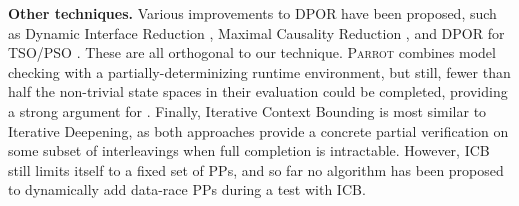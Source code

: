 {\bf Other techniques.} Various improvements to DPOR have been proposed, such as Dynamic Interface Reduction \cite{demeter}, Maximal Causality Reduction \cite{mcr}, and DPOR for TSO/PSO \cite{tsopso}.
These are all orthogonal to our technique.
\textsc{Parrot} \cite{parrot} combines model checking with a partially-determinizing runtime environment, but still, fewer than half the non-trivial state spaces in their evaluation could be completed, providing a strong argument for \quicksand.
Finally, Iterative Context Bounding \cite{chess} is most similar to Iterative Deepening, as both approaches provide a concrete partial verification on some subset of interleavings when full completion is intractable.
However, ICB still limits itself to a fixed set of PPs, and so far no algorithm has been proposed to dynamically add data-race PPs during a test with ICB.






